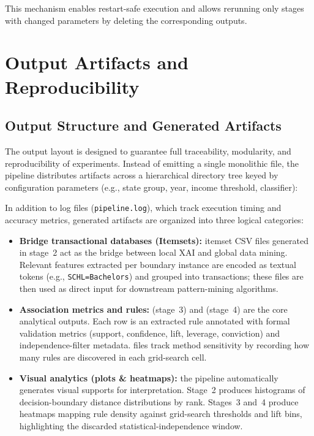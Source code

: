 This mechanism enables restart-safe execution and allows rerunning only stages with changed parameters by deleting the corresponding outputs.

\chapter{Output Artifacts and Reproducibility}
\label{app:output-artifacts}

\section{Output Structure and Generated Artifacts}
\label{app:output-structure}

The output layout is designed to guarantee full traceability, modularity, and reproducibility of experiments.
Instead of emitting a single monolithic file, the pipeline distributes artifacts across a hierarchical directory tree keyed by configuration parameters (e.g., state group, year, income threshold, classifier):

\begin{center}
\end{center}

In addition to log files (\texttt{pipeline.log}), which track execution timing and accuracy metrics, generated artifacts are organized into three logical categories:

\begin{itemize}
  \item \textbf{Bridge transactional databases (Itemsets):} itemset CSV files generated in stage~2 act as the bridge between local XAI and global data mining.
  Relevant features extracted per boundary instance are encoded as textual tokens (e.g., \texttt{SCHL=Bachelors}) and grouped into transactions; these files are then used as direct input for downstream pattern-mining algorithms.
  \item \textbf{Association metrics and rules:}  (stage~3) and  (stage~4) are the core analytical outputs.
  Each row is an extracted rule annotated with formal validation metrics (support, confidence, lift, leverage, conviction) and independence-filter metadata.
   files track method sensitivity by recording how many rules are discovered in each grid-search cell.
  \item \textbf{Visual analytics (plots \& heatmaps):} the pipeline automatically generates visual supports for interpretation.
  Stage~2 produces histograms of decision-boundary distance distributions by rank.
  Stages~3 and~4 produce heatmaps mapping rule density against grid-search thresholds and lift bins, highlighting the discarded statistical-independence window.
\end{itemize}

